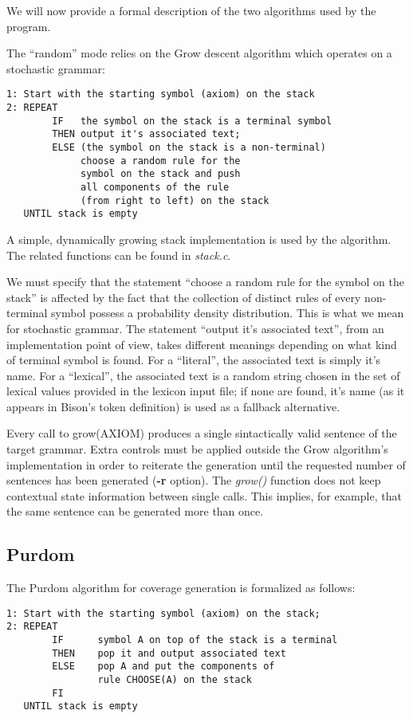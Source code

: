\documentclass[a4paper,12pt]{article}
\begin{document}
We will now provide a formal description of the two algorithms used by the program.

The ``random'' mode relies on the Grow descent algorithm which operates on a stochastic grammar:

\begin{verbatim}
1: Start with the starting symbol (axiom) on the stack
2: REPEAT
        IF   the symbol on the stack is a terminal symbol
        THEN output it's associated text;
        ELSE (the symbol on the stack is a non-terminal)
             choose a random rule for the 
             symbol on the stack and push
             all components of the rule
             (from right to left) on the stack
   UNTIL stack is empty
\end{verbatim}

\noindent
A simple, dynamically growing stack implementation is used by the algorithm. The related functions can be found in \emph{stack.c}.

We must specify that the statement ``choose a random rule for the symbol on the stack'' is affected by the fact that the collection of distinct rules of every non-terminal symbol possess a probability density distribution. This is what we mean for stochastic grammar.
The statement ``output it's associated text'', from an implementation point of view, takes different meanings depending on what kind of terminal symbol is found. For a ``literal'', the associated text is simply it's name. For a ``lexical'', the associated text is a random string chosen in the set of lexical values provided in the lexicon input file; if none are found, it's name (as it appears in Bison's token definition) is used as a fallback alternative.

Every call to grow(AXIOM) produces a single sintactically valid sentence of the target grammar. Extra controls must be applied outside the Grow algorithm's implementation in order to reiterate the generation until the requested number of sentences has been generated (\textbf{-r} option). The \emph{grow()} function does not keep contextual state information between single calls. This implies, for example, that the same sentence can be generated more than once.

\subsection{Purdom}
The Purdom algorithm for coverage generation is formalized as follows:

\begin{verbatim}
1: Start with the starting symbol (axiom) on the stack;
2: REPEAT
        IF      symbol A on top of the stack is a terminal
        THEN    pop it and output associated text
        ELSE    pop A and put the components of
                rule CHOOSE(A) on the stack
        FI
   UNTIL stack is empty
\end{verbatim}
\end{document}
